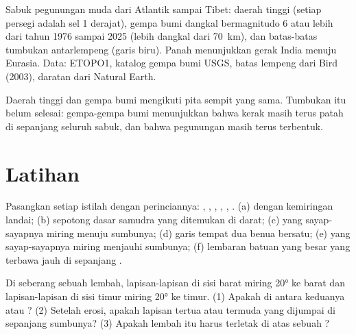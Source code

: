 \begin{omfigure}
{\small Sabuk pegunungan muda dari Atlantik sampai Tibet: daerah tinggi (setiap
persegi adalah sel 1 derajat), gempa bumi dangkal bermagnitudo 6 atau lebih
dari tahun 1976 sampai 2025 (lebih dangkal dari \qty{70}{km}), dan batas-batas
tumbukan antarlempeng (garis biru). Panah menunjukkan gerak India menuju
Eurasia. Data: ETOPO1, katalog gempa bumi USGS, batas lempeng dari Bird (2003),
daratan dari Natural Earth.}
\end{omfigure}

Daerah tinggi dan gempa bumi mengikuti pita sempit yang sama. Tumbukan itu
belum selesai: gempa-gempa bumi menunjukkan bahwa kerak masih terus patah di
sepanjang seluruh sabuk, dan bahwa pegunungan masih terus terbentuk.

\section{Latihan}

\begin{exercise}[$\star$]\label{exo:g12:mountain-building:1}
Pasangkan setiap istilah dengan perinciannya: , , ,
, , . (a)  dengan kemiringan landai; (b) sepotong
dasar samudra yang ditemukan di darat; (c)  yang sayap-sayapnya miring
menuju sumbunya; (d) garis tempat dua benua bersatu; (e)  yang
sayap-sayapnya miring menjauhi sumbunya; (f) lembaran batuan yang besar yang
terbawa jauh di sepanjang .
\end{exercise}

\begin{exercise}[$\star$]\label{exo:g12:mountain-building:2}
Di seberang sebuah lembah, lapisan-lapisan di sisi barat miring \ang{20} ke
barat dan lapisan-lapisan di sisi timur miring \ang{20} ke timur. (1) Apakah
 di antara keduanya  atau ? (2) Setelah erosi, apakah
lapisan tertua atau termuda yang dijumpai di sepanjang sumbunya? (3) Apakah
lembah itu harus terletak di atas sebuah ?
\end{exercise}

